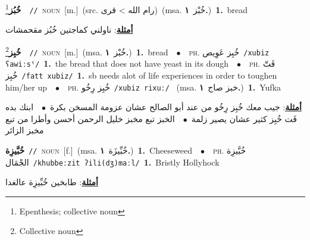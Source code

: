 \documentclass[10pt,a4paper,twoside]{article} %
\begin{document}
\begin{multicols}{2}
{{\setlength\topsep{0pt}\textbf{\foreignlanguage{arabic}{خُبُز}}\footnote{Epenthesis; collective noun}\ \ {\color{gray}\texttt{//}\color{black}}\ \textsc{noun}\ [m.]\ (src. \color{gray}\foreignlanguage{arabic}{رام الله > قرى}\color{black})\ \color{gray}(msa. \foreignlanguage{arabic}{خُبْز}~\foreignlanguage{arabic}{\textbf{١.}})\color{black}\ \textbf{1.}~bread\  \begin{flushright}\color{gray}\foreignlanguage{arabic}{\textbf{\underline{\foreignlanguage{arabic}{أمثلة}}}: ناولني كماجتين خُبُز مقحمشات}\end{flushright}\color{black}} \vspace{2mm}

{\setlength\topsep{0pt}\textbf{\foreignlanguage{arabic}{خُبِز}}\footnote{Collective noun}\ \ {\color{gray}\texttt{//}\color{black}}\ \textsc{noun}\ [m.]\ \color{gray}(msa. \foreignlanguage{arabic}{خُبْز}~\foreignlanguage{arabic}{\textbf{١.}})\color{black}\ \textbf{1.}~bread\ \ $\bullet$\ \ \textsc{ph.} \color{gray} \foreignlanguage{arabic}{خُبِز عَوِيص}\color{black}\ {\color{gray}\texttt{/{\sffamily xubiz ʕawiːsˤ}/}\color{black}}\ \textbf{1.}~the bread that does not have yeast in its dough\ \ $\bullet$\ \ \textsc{ph.} \color{gray} \foreignlanguage{arabic}{فَتّ خُبِز}\color{black}\ {\color{gray}\texttt{/{\sffamily fatt xubiz}/}\color{black}}\ \textbf{1.}~sb needs alot of life experiences in order to toughen him/her up\ \ $\bullet$\ \ \textsc{ph.} \color{gray} \foreignlanguage{arabic}{خُبِز رِخُو}\color{black}\ {\color{gray}\texttt{/{\sffamily xubiz rixuː}/}\color{black}}\ \color{gray} (msa. \foreignlanguage{arabic}{خبز صاج}~\foreignlanguage{arabic}{\textbf{١.}})\color{black}\ \textbf{1.}~Yufka\  \begin{flushright}\color{gray}\foreignlanguage{arabic}{\textbf{\underline{\foreignlanguage{arabic}{أمثلة}}}: جيب معك خُبِز رِخُو من عند أبو الصالح عشان عزومة المسخن بكرة\ $\bullet$\ \  ابنك بده فَت خُبِز كثير عشان يصير زلمة\ $\bullet$\ \  الخبز تبع مخبز خليل الرحمن أحسن وأطرا من تبع مخبز الزائر}\end{flushright}\color{black}} \vspace{2mm}

{\setlength\topsep{0pt}\textbf{\foreignlanguage{arabic}{خُبَّيزِة}}\ {\color{gray}\texttt{//}\color{black}}\ \textsc{noun}\ [f.]\ \color{gray}(msa. \foreignlanguage{arabic}{خُبِّيزَة}~\foreignlanguage{arabic}{\textbf{١.}})\color{black}\ \textbf{1.}~Cheeseweed\ \ $\bullet$\ \ \textsc{ph.} \color{gray} \foreignlanguage{arabic}{خُبَّيزِة الجْمَال}\color{black}\ {\color{gray}\texttt{/{\sffamily khubbeːzit ʔili(dʒ)maːl}/}\color{black}}\ \textbf{1.}~Bristly Hollyhock\  \begin{flushright}\color{gray}\foreignlanguage{arabic}{\textbf{\underline{\foreignlanguage{arabic}{أمثلة}}}: طابخين خُبِّيزِة عالغدا}\end{flushright}\color{black}} \vspace{2mm}

}
\end{multicols}
\end{document}
